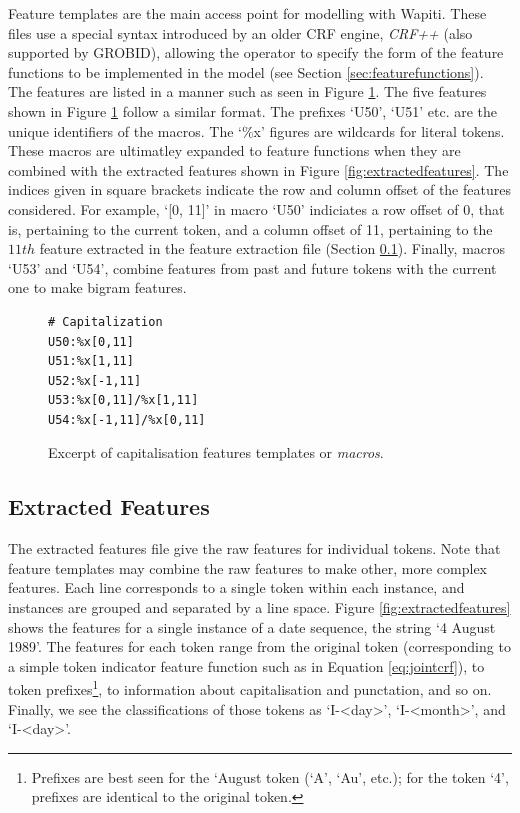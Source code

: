 Feature templates are the main access point for modelling with Wapiti. These files use a special syntax introduced by an older CRF engine, \emph{CRF++} (also supported by GROBID), allowing the operator to specify the form of the feature functions to be implemented in the model (see Section \ref{sec:featurefunctions}). The features are listed in a manner such as seen in Figure \ref{fig:featuretemplatefile}. The five features shown in Figure \ref{fig:featuretemplatefile} follow a similar format. The prefixes `U50', `U51' etc. are the unique identifiers of the macros. The `\%x' figures are wildcards for literal tokens. These macros are ultimatley expanded to feature functions when they are combined with the extracted features shown in Figure \ref{fig:extractedfeatures}. The indices given in square brackets indicate the row and column offset of the features considered. For example, `[0, 11]' in macro `U50' indiciates a row offset of $0$, that is, pertaining to the current token, and a column offset of 11, pertaining to the $11th$ feature extracted in the feature extraction file (Section \ref{subsec:extractedfeatures}). Finally, macros `U53' and `U54', combine features from past and future tokens with the current one to make bigram features.

\begin{figure}
\centering
\begin{BVerbatim}
# Capitalization
U50:%x[0,11]
U51:%x[1,11]
U52:%x[-1,11]
U53:%x[0,11]/%x[1,11]
U54:%x[-1,11]/%x[0,11]
\end{BVerbatim}
\caption{Excerpt of capitalisation features templates or \emph{macros}.}
\label{fig:featuretemplatefile}
\end{figure}

\subsection{Extracted Features}
\label{subsec:extractedfeatures}

The extracted features file give the raw features for individual tokens. Note that feature templates may combine the raw features to make other, more complex features. Each line corresponds to a single token within each instance, and instances are grouped and separated by a line space. Figure \ref{fig:extractedfeatures} shows the features for a single instance of a date sequence, the string `4 August 1989'. The features for each token range from the original token (corresponding to a simple token indicator feature function such as in Equation \ref{eq:jointcrf}), to token prefixes\footnote{Prefixes are best seen for the `August token (`A', `Au', etc.); for the token `4', prefixes are identical to the original token.}, to information about capitalisation and punctation, and so on. Finally, we see the classifications of those tokens as `I-<day>', `I-<month>', and `I-<day>'.

